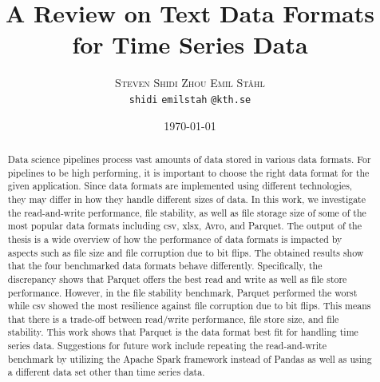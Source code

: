 \documentclass[12pt,twoside,english]{article}
\title{A Review on Text Data Formats for Time Series Data}
\author{
        \textsc{Steven Shidi Zhou}
            \qquad
        \textsc{Emil Ståhl}
        \mbox{}\\
        \normalsize
            \texttt{shidi}
        \textbar{}
            \texttt{emilstah}
        \normalsize
            \texttt{@kth.se}
}
\date{\today}
\begin{document}


\maketitle


\begin{abstract}
\label{sec:abstract}
\begin{center}
Data science pipelines process vast amounts of data stored in various data formats. For pipelines to be high performing, it is important to choose the right data format for the given application. Since data formats are implemented using different technologies, they may differ in how they handle different sizes of data. In this work, we investigate the read-and-write performance, file stability, as well as file storage size of some of the most popular data formats including csv, xlsx, Avro, and Parquet. The output of the thesis is a wide overview of how the performance of data formats is impacted by aspects such as file size and file corruption due to bit flips. The obtained results show that the four benchmarked data formats behave differently. Specifically, the discrepancy shows that Parquet offers the best read and write as well as file store performance. However, in the file stability benchmark, Parquet performed the worst while csv showed the most resilience against file corruption due to bit flips. This means that there is a trade-off between read/write performance, file store size, and file stability. This work shows that Parquet is the data format best fit for handling time series data. Suggestions for future work include repeating the read-and-write benchmark by utilizing the Apache Spark framework instead of Pandas as well as using a different data set other than time series data. 
\end{center} 
\end{abstract}


\clearpage
\tableofcontents
\clearpage



\clearpage
{}
\end{document}
